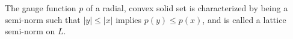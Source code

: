 The gauge function $p$ of a radial, convex solid set is characterized by being a semi-norm such that $|y| \leq |x|$ implies $p(y) \leq p(x)$, and is called a lattice semi-norm on $L$.
